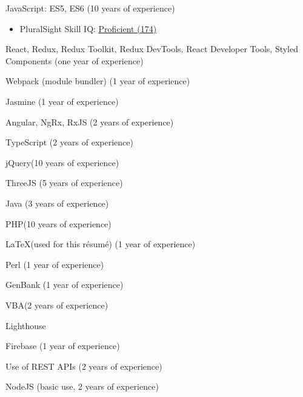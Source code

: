 \documentclass[]{deedy-resume-openfont}
\begin{document}
\descript{}
\begin{tightemize}
\item JavaScript\footnotemark[\value{footnote}]: ES5, ES6 (10 years of experience)
\begin{itemize}
\item PluralSight Skill IQ: \href{https://app.pluralsight.com/profile/alexander-koik-cesto}{\underline{Proficient (174)}}
\end{itemize}
\item React\footnotemark[\value{footnote}], Redux, Redux Toolkit, Redux DevTools, React Developer Tools, Styled Components (one year of experience)
\item Webpack (module bundler) (1 year of experience)
\item Jasmine (1 year of experience)
\item Angular\footnotemark[\value{footnote}], NgRx, RxJS (2 years of experience)
\item TypeScript (2 years of experience)
\item jQuery\footnotemark[\value{footnote}] (10 years of experience)
\item ThreeJS (5 years of experience)
\item Java (3 years of experience)
\item PHP\footnotemark[\value{footnote}] (10 years of experience)
\item \LaTeX \xspace (used for this r\'esum\'e) (1 year of experience)
\item Perl (1 year of experience)
\item GenBank (1 year of experience)
\item VBA\footnotemark[\value{footnote}] (2 years of experience)
\end{tightemize}
\sectionsep

\descript{}
\begin{tightemize}
\item Lighthouse
\end{tightemize}
\sectionsep

\descript{}
\begin{tightemize}
\item Firebase (1 year of experience)
\item Use of REST APIs (2 years of experience)
\item NodeJS (basic use, 2 years of experience)
\end{tightemize}
\sectionsep
\end{document}
